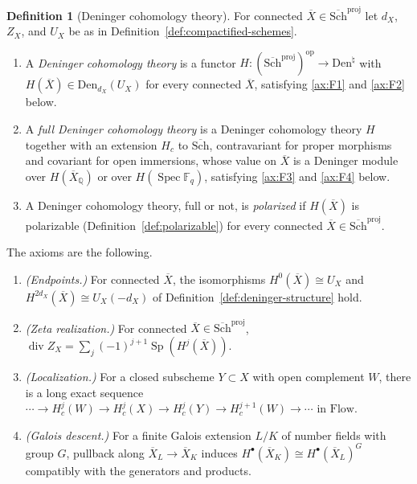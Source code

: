\documentclass[11pt]{amsart}
\theoremstyle{plain}
\theoremstyle{definition}
\newtheorem{definition}[theorem]{Definition}
\theoremstyle{remark}
\numberwithin{equation}{section}
\newcommand{\Q}{\mathbb{Q}}
\newcommand{\F}{\mathbb{F}}
\newcommand{\Xbar}{\overline{X}}
\newcommand{\Schbar}{\overline{\mathrm{Sch}}}
\newcommand{\Den}{\mathrm{Den}}
\newcommand{\Flow}{\mathrm{Flow}}
\DeclareMathOperator{\Spec}{Spec}
\DeclareMathOperator{\divisor}{div}
\begin{document}
\begin{definition}[Deninger cohomology theory]
\label{def:deninger-theory}
For connected $\Xbar\in\Schbar^{\mathrm{proj}}$ let $d_X$, $Z_X$, and
$U_X$ be as in Definition~\ref{def:compactified-schemes}.
\begin{enumerate}[label=(\alph*)]
\item\label{item:den-core} A \emph{Deninger cohomology theory} is a
  functor $H:(\Schbar^{\mathrm{proj}})^{\mathrm{op}}\to\Den^\natural$ with
  $H(\Xbar)\in\Den_{d_X}(U_X)$ for every connected $\Xbar$, satisfying
  \ref{ax:F1} and \ref{ax:F2} below.
\item\label{item:den-full} A \emph{full Deninger cohomology theory} is
  a Deninger cohomology theory $H$ together with an extension $H_c$ to
  $\Schbar$, contravariant for proper morphisms and covariant for open
  immersions, whose value on $\Xbar$ is a Deninger module over
  $H(\Xbar_\Q)$ or over $H(\Spec\F_q)$, satisfying \ref{ax:F3} and
  \ref{ax:F4} below.
\item\label{item:den-pol} A Deninger cohomology theory, full or not,
  is \emph{polarized} if $H(\Xbar)$ is polarizable
  (Definition~\ref{def:polarizable}) for every connected
  $\Xbar\in\Schbar^{\mathrm{proj}}$.
\end{enumerate}
The axioms are the following.
\begin{enumerate}[label=\textbf{F\arabic*},ref=F\arabic*,leftmargin=*]
\item\label{ax:F1} \emph{(Endpoints.)} For connected $\Xbar$, the
  isomorphisms $H^0(\Xbar)\cong U_X$ and
  $H^{2d_X}(\Xbar)\cong U_X(-d_X)$ of
  Definition~\ref{def:deninger-structure} hold.
\item\label{ax:F2} \emph{(Zeta realization.)} For connected
  $\Xbar\in\Schbar^{\mathrm{proj}}$,
  $\divisor Z_X=\sum_j(-1)^{j+1}\operatorname{Sp}(H^j(\Xbar))$.
\item\label{ax:F3} \emph{(Localization.)} For a closed subscheme
  $Y\subset X$ with open complement $W$, there is a long exact sequence
  $\cdots\to H^j_c(W)\to H^j_c(X)\to H^j_c(Y)\to H^{j+1}_c(W)
  \to\cdots$ in $\Flow$.
\item\label{ax:F4} \emph{(Galois descent.)} For a finite Galois
  extension $L/K$ of number fields with group $G$, pullback along
  $\Xbar_L\to\Xbar_K$ induces
  $H^\bullet(\Xbar_K)\cong H^\bullet(\Xbar_L)^G$ compatibly with the
  generators and products.
\end{enumerate}
\end{definition}
\end{document}
